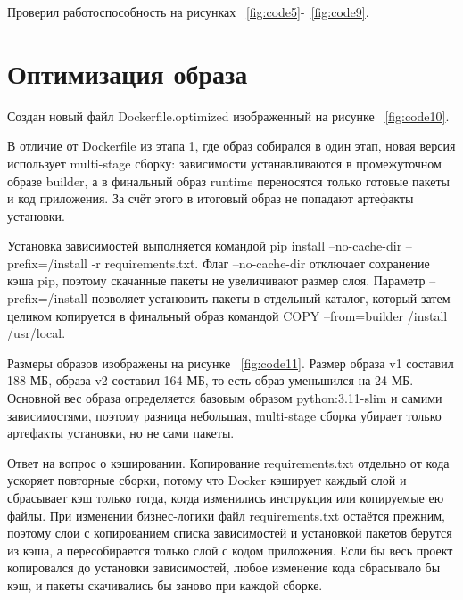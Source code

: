 Проверил работоспособность на рисунках ~\ref{fig:code5}-~\ref{fig:code9}.

\section{Оптимизация образа}

Создан новый файл Dockerfile.optimized изображенный на рисунке ~\ref{fig:code10}.

В отличие от Dockerfile из этапа 1, где образ собирался в один этап, новая версия использует multi-stage сборку: зависимости устанавливаются в промежуточном образе builder, а в финальный образ runtime переносятся только готовые пакеты и код приложения. За счёт этого в итоговый образ не попадают артефакты установки.

Установка зависимостей выполняется командой pip install --no-cache-dir --prefix=/install -r requirements.txt. Флаг --no-cache-dir отключает сохранение кэша pip, поэтому скачанные пакеты не увеличивают размер слоя. Параметр --prefix=/install позволяет установить пакеты в отдельный каталог, который затем целиком копируется в финальный образ командой COPY --from=builder /install /usr/local.


Размеры образов изображены на рисунке ~\ref{fig:code11}. Размер образа v1 составил 188 МБ, образа v2 составил 164 МБ, то есть образ уменьшился на 24 МБ. Основной вес образа определяется базовым образом python:3.11-slim и самими зависимостями, поэтому разница небольшая, multi-stage сборка убирает только артефакты установки, но не сами пакеты.


Ответ на вопрос о кэшировании. Копирование requirements.txt отдельно от кода ускоряет повторные сборки, потому что Docker кэширует каждый слой и сбрасывает кэш только тогда, когда изменились инструкция или копируемые ею файлы. При изменении бизнес-логики файл requirements.txt остаётся прежним, поэтому слои с копированием списка зависимостей и установкой пакетов берутся из кэша, а пересобирается только слой с кодом приложения. Если бы весь проект копировался до установки зависимостей, любое изменение кода сбрасывало бы кэш, и пакеты скачивались бы заново при каждой сборке.

